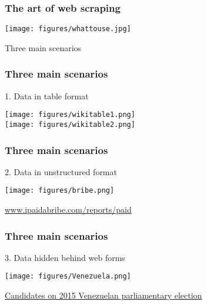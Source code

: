 \documentclass{beamer}
\begin{document}
\begin{frame}
	\frametitle{The art of web scraping}
	\centering
	\texttt{[image: figures/whattouse.jpg]}
	
	\Large{\alert{Three main scenarios}}
	
\end{frame}

\begin{frame}
	\frametitle{Three main scenarios}
	
	1. Data in table format \\
	\vspace{.25cm}
	
	
	\texttt{[image: figures/wikitable1.png]}\\
	\texttt{[image: figures/wikitable2.png]}
	
\end{frame}

\begin{frame}
	\frametitle{Three main scenarios}
	
	2. Data in unstructured format  \\
	\vspace{.25cm}
	
	\texttt{[image: figures/bribe.png]}
	
	\centering\href{www.ipaidabribe.com/reports/paid}{www.ipaidabribe.com/reports/paid}
\end{frame}

\begin{frame}
	\frametitle{Three main scenarios}
	
	3. Data hidden behind web forms \\
	\vspace{.25cm}
	
	
	\texttt{[image: figures/Venezuela.png]}
	
	\centering\href{http://eligetucandidato.org/filtro/}{Candidates on 2015 Venezuelan parliamentary election}
\end{frame}
\end{document}
